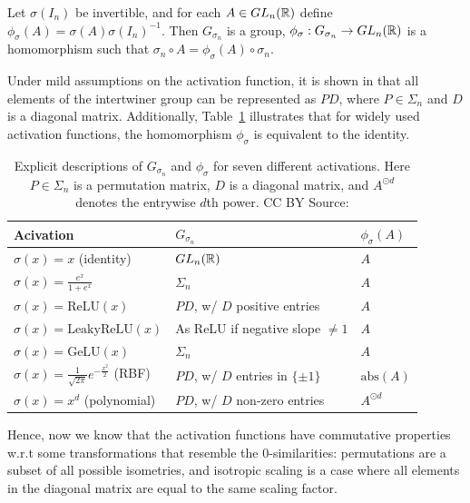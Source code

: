 \documentclass[../main.tex]{subfiles}
\begin{document}
\begin{lemma}
  \label{lem:intertwiner}
  Let $\sigma(I_n)$ be invertible, and for each $A \in GL_{n}(\mathbb{R})$ define $\phi_\sigma(A) = \sigma(A) \sigma(I_n)^{-1}$. Then $G_{\sigma_n}$ is a group, $\phi_\sigma: G_{\sigma_n} \to GL_{n}(\mathbb{R})$ is a homomorphism  such that $\sigma_n \circ A = \phi_{\sigma}(A) \circ \sigma_n$. 
\end{lemma}


Under mild assumptions on the activation function, it is shown in \cite{godfrey_symmetries_2023} that all elements of the intertwiner group can be represented as $PD$, where $P \in \Sigma_n$ and $D$ is a diagonal matrix. Additionally, Table~\ref{tab:intertwiner-groups} illustrates that for widely used activation functions, the homomorphism $\phi_\sigma$ is equivalent to the identity. 

\begin{table}[ht]
\centering
\begin{tabular}[b]{lll}
\toprule
     Acivation &     $G_{\sigma_n}$ &     $\phi_\sigma(A)$ \\
\toprule

$\sigma(x) = x$ (identity) & $GL_n(\mathbb{R})$ & $A$\\
\midrule[.05pt]
$\sigma(x) = \frac{e^x}{1+e^x}$ & $\Sigma_n$ & $A$\\
\midrule[.05pt]
$\sigma(x) = \text{ReLU}(x)$ & $P D$, w/ $D$ positive entries & $A$\\
\midrule[.05pt]
$\sigma(x) = \text{LeakyReLU}(x)$ & As ReLU if negative slope $\neq 1$ & $A$ \\
\midrule[.05pt]
 $\sigma(x) = \text{GeLU}(x)$  & $\Sigma_n$ & $A$\\
 \midrule[.05pt]
$\sigma(x) = \frac{1}{\sqrt{2 \pi}} e^{-\frac{x^2}{2}}$ (RBF) & $P D$, w/ $D$ entries in $\{\pm 1\}$ & 
$\mathrm{abs}(A)$\\
\midrule[.05pt]
$\sigma(x) = x^d$ (polynomial) &  $P D$, w/ $D$ non-zero entries
& $A^{\odot  d}$
\end{tabular}
\caption{Explicit descriptions of $G_{\sigma_n}$ and $\phi_{\sigma}$ for seven different activations. Here $P \in \Sigma_n$ is a permutation matrix, $D$ is a diagonal matrix, and $A^{\odot d}$ denotes the entrywise $d$th power. CC BY Source: \cite{godfrey_symmetries_2023}}
\label{tab:intertwiner-groups} 
\end{table}

Hence, now we know that the activation functions have commutative properties w.r.t some transformations that resemble the $0$-similarities: permutations are a subset of all possible isometries, and isotropic scaling is a case where all elements in the diagonal matrix are equal to the same scaling factor.
\end{document}
